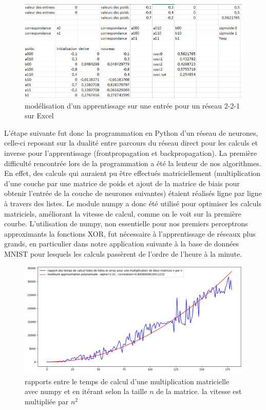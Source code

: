 \documentclass[
    10pt,
    a4paper,
    oneside,
    headinclude,footinclude,
    BCOR=5mm,
    captions=tableabove
]{scrartcl}
\begin{document}
\begin{figure}[!h]
\includegraphics[width=\linewidth]{excelXOR.png}
\centering
 \caption{modélisation d'un apprentissage sur une entrée pour un réseau 2-2-1 sur Excel}
 \label{fig:excelXOR}
\end{figure}
\vspace{5mm}
L'étape suivante fut donc la programmation en Python d'un réseau de neurones, celle-ci reposant sur la dualité entre parcours du réseau direct pour les calculs et inverse pour l'apprentissage (frontpropagation et backpropagation). La première difficulté rencontrée lors de la programmation a été la lenteur de nos algorithmes. En effet, des calculs qui auraient pu être effectués matriciellement (multiplication d'une couche par une matrice de poids et ajout de la matrice de biais pour obtenir l'entrée de la couche de neurones suivantes) étaient réalisés ligne par ligne à travers des listes. Le module numpy a donc été utilisé pour optimiser les calculs matriciels, améliorant la vitesse de calcul, comme on le voit sur la première courbe. L'utilisation de numpy, non essentielle pour nos premiers perceptrons approximants la fonctions XOR, fut nécessaire à l'apprentissage de réseaux plus grands, en particulier dans notre application suivante à la base de données MNIST pour lesquels les calculs passèrent de l'ordre de l'heure à la minute.

\begin{figure}[h!]
\includegraphics[width=\linewidth]{tpsCalcul.png}
\centering
 \caption{rapports entre le temps de calcul d'une multiplication matricielle avec numpy et en itérant selon la taille $n$ de la matrice. la vitesse est multipliée par  $n^{2}$ }
 \label{fig:tpsCalcul}
\end{figure}
\end{document}
